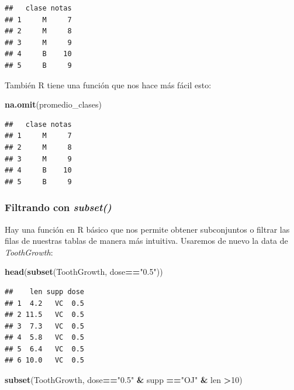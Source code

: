 \documentclass[
]{book}
\newenvironment{Shaded}{\begin{snugshade}}{\end{snugshade}}
\newcommand{\DecValTok}[1]{\textcolor[rgb]{0.00,0.00,0.81}{#1}}
\newcommand{\FunctionTok}[1]{\textcolor[rgb]{0.13,0.29,0.53}{\textbf{#1}}}
\newcommand{\NormalTok}[1]{#1}
\newcommand{\SpecialCharTok}[1]{\textcolor[rgb]{0.81,0.36,0.00}{\textbf{#1}}}
\newcommand{\StringTok}[1]{\textcolor[rgb]{0.31,0.60,0.02}{#1}}
\begin{document}
\begin{Shaded}
\end{Shaded}

\begin{verbatim}
##   clase notas
## 1     M     7
## 2     M     8
## 3     M     9
## 4     B    10
## 5     B     9
\end{verbatim}

\hfill\break
También R tiene una función que nos hace más fácil esto:

\begin{Shaded}
\begin{Highlighting}[]
\FunctionTok{na.omit}\NormalTok{(promedio\_clases)}
\end{Highlighting}
\end{Shaded}

\begin{verbatim}
##   clase notas
## 1     M     7
## 2     M     8
## 3     M     9
## 4     B    10
## 5     B     9
\end{verbatim}

\subsubsection{\texorpdfstring{Filtrando con \emph{subset()}}{Filtrando con subset()}}\label{filtrando-con-subset}

Hay una función en R básico que nos permite obtener subconjuntos o filtrar las filas de nuestras tablas de manera más intuitiva.
Usaremos de nuevo la data de \emph{ToothGrowth}:

\begin{Shaded}
\begin{Highlighting}[]
\FunctionTok{head}\NormalTok{(}\FunctionTok{subset}\NormalTok{(ToothGrowth, dose}\SpecialCharTok{==}\StringTok{"0.5"}\NormalTok{))}
\end{Highlighting}
\end{Shaded}

\begin{verbatim}
##    len supp dose
## 1  4.2   VC  0.5
## 2 11.5   VC  0.5
## 3  7.3   VC  0.5
## 4  5.8   VC  0.5
## 5  6.4   VC  0.5
## 6 10.0   VC  0.5
\end{verbatim}

\begin{Shaded}
\begin{Highlighting}[]
\FunctionTok{subset}\NormalTok{(ToothGrowth, dose}\SpecialCharTok{==}\StringTok{"0.5"} \SpecialCharTok{\&}\NormalTok{ supp }\SpecialCharTok{==}\StringTok{"OJ"} \SpecialCharTok{\&}\NormalTok{ len }\SpecialCharTok{\textgreater{}}\DecValTok{10}\NormalTok{)}
\end{Highlighting}
\end{Shaded}
\end{document}
